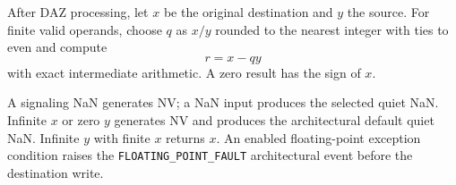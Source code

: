 After DAZ processing, let \(x\) be the original destination and \(y\) the source. For finite valid operands, choose \(q\) as \(x/y\) rounded to the nearest integer with ties to even and compute
\[
  r = x - qy
\]
with exact intermediate arithmetic. A zero result has the sign of \(x\).

A signaling NaN generates NV; a NaN input produces the selected quiet NaN. Infinite \(x\) or zero \(y\) generates NV and produces the architectural default quiet NaN. Infinite \(y\) with finite \(x\) returns \(x\). An enabled floating-point exception condition raises the \texttt{FLOATING\_POINT\_FAULT} architectural event before the destination write.

